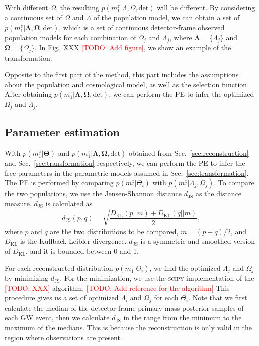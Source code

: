 \documentclass[aps,prd,twocolumn,superscriptaddress,preprintnumbers,nofootinbib,hidelinks]{revtex4-2}
\newcommand{\todo}[1]{\textcolor{red}{[TODO: #1]}}
\begin{document}
With different $\Omega$, the resulting $p(m^z_1|\Lambda, \Omega, \mathrm{det})$ will be different.
By considering a continuous set of $\Omega$ and  $\Lambda$ of the population model, we can obtain a set of $p(m^z_1|\mathbf{\Lambda}, \mathbf{\Omega}, \mathrm{det})$, which is a set of continuous detector-frame observed population models for each combination of $\Omega_j$ and $\Lambda_j$, where $\mathbf{\Lambda} = \{\Lambda_j\}$ and $\mathbf{\Omega} = \{\Omega_j\}$.
In Fig.~XXX \todo{Add figure}, we show an example of the transformation.

Opposite to the first part of the method, this part includes the assumptions about the population and cosmological model, as well as the selection function.
After obtaining $p(m^z_1|\mathbf{\Lambda}, \mathbf{\Omega}, \mathrm{det})$, we can perform the \ac{PE} to infer the optimized $\Omega_j$ and $\Lambda_j$.

\subsection{Parameter estimation}
\label{sec:pe}

With $p(m^z_1|\mathbf{\Theta})$ and $p(m^z_1|\mathbf{\Lambda}, \mathbf{\Omega}, \mathrm{det})$ obtained from Sec.~\ref{sec:reconstruction} and Sec.~\ref{sec:transformation} respectively, we can perform the \ac{PE} to infer the free parameters in the parametric models assumed in Sec.~\ref{sec:transformation}.
The \ac{PE} is performed by comparing $p(m^z_1|\Theta_i)$ with $p(m^z_1|\Lambda_j, \Omega_j)$.
To compare the two populations, we use the Jensen-Shannon distance $d_\mathrm{JS}$ as the distance measure.
$d_\mathrm{JS}$ is calculated as
\begin{equation}
    d_\mathrm{JS}(p, q) = \sqrt{\frac{D_\mathrm{KL}(p||m) + D_\mathrm{KL}(q||m)}{2}},
\end{equation}
where $p$ and $q$ are the two distributions to be compared, $m = (p + q) / 2$, and $D_\mathrm{KL}$ is the Kullback-Leibler divergence.
$d_\mathrm{JS}$ is a symmetric and smoothed version of $D_\mathrm{KL}$, and it is bounded between 0 and 1.

For each reconstructed distribution $p(m^z_1|\Theta_i)$, we find the optimized $\Lambda_j$ and $\Omega_j$ by minimizing $d_\mathrm{JS}$.
For the minimization, we use the \textsc{scipy} \citep{2020SciPy-NMeth} implementation of the \todo{XXX} algorithm. \todo{Add reference for the algorithm}
This procedure gives us a set of optimized $\Lambda_i$ and $\Omega_j$ for each $\Theta_i$.
Note that we first calculate the median of the detector-frame primary mass posterior samples of each \ac{GW} event, then we calculate $d_\mathrm{JS}$ in the range from the minimum to the maximum of the medians.
This is because the reconstruction is only valid in the region where observations are present.
\end{document}
